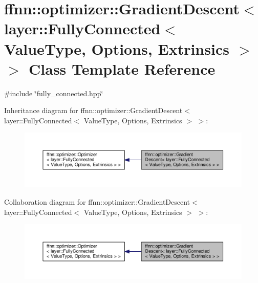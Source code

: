\hypertarget{classffnn_1_1optimizer_1_1_gradient_descent_3_01layer_1_1_fully_connected_3_01_value_type_00_01_ddfb200b81fb62a6d9db0a043eb4e0ff}{\section{ffnn\-:\-:optimizer\-:\-:Gradient\-Descent$<$ layer\-:\-:Fully\-Connected$<$ Value\-Type, Options, Extrinsics $>$ $>$ Class Template Reference}
\label{classffnn_1_1optimizer_1_1_gradient_descent_3_01layer_1_1_fully_connected_3_01_value_type_00_01_ddfb200b81fb62a6d9db0a043eb4e0ff}
}


{\ttfamily \#include \char`\"{}fully\-\_\-connected.\-hpp\char`\"{}}



Inheritance diagram for ffnn\-:\-:optimizer\-:\-:Gradient\-Descent$<$ layer\-:\-:Fully\-Connected$<$ Value\-Type, Options, Extrinsics $>$ $>$\-:
\nopagebreak
\begin{figure}[H]
\begin{center}
\leavevmode
\includegraphics[width=350pt]{classffnn_1_1optimizer_1_1_gradient_descent_3_01layer_1_1_fully_connected_3_01_value_type_00_01_39ad54512ff1957dd1b22e0a25a0e829}
\end{center}
\end{figure}


Collaboration diagram for ffnn\-:\-:optimizer\-:\-:Gradient\-Descent$<$ layer\-:\-:Fully\-Connected$<$ Value\-Type, Options, Extrinsics $>$ $>$\-:
\nopagebreak
\begin{figure}[H]
\begin{center}
\leavevmode
\includegraphics[width=350pt]{classffnn_1_1optimizer_1_1_gradient_descent_3_01layer_1_1_fully_connected_3_01_value_type_00_01_452ed1b4df3a279848aa9b40a85a4da7}
\end{center}
\end{figure}
